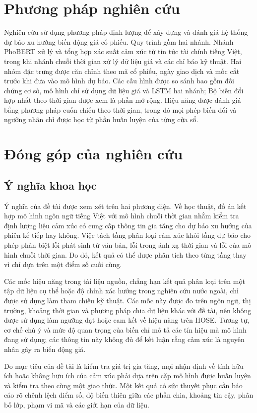 \documentclass[12pt, a4paper, oneside]{report}
\begin{document}
\section{Phương pháp nghiên cứu}

Nghiên cứu sử dụng phương pháp định lượng để xây dựng và đánh giá hệ thống dự báo
xu hướng biến động giá cổ phiếu. Quy trình gồm hai nhánh. Nhánh PhoBERT xử lý và tổng hợp
xác suất cảm xúc từ tin tức tài chính tiếng Việt, trong khi nhánh chuỗi thời gian xử lý dữ liệu
giá và các chỉ báo kỹ thuật. Hai nhóm đặc trưng được căn chỉnh theo mã cổ phiếu, ngày giao
dịch và mốc cắt trước khi đưa vào mô hình dự báo. Các cấu hình được so sánh bao gồm đối chứng cơ sở,
mô hình chỉ sử dụng dữ liệu giá và LSTM hai nhánh; Bộ biến đổi hợp nhất theo thời gian được xem là phần mở
rộng. Hiệu năng được đánh giá bằng phương pháp cuốn chiếu theo thời gian, trong đó mọi phép
biến đổi và ngưỡng nhãn chỉ được học từ phần huấn luyện của từng cửa sổ.
\section{Đóng góp của nghiên cứu}

\subsection{Ý nghĩa khoa học}

Ý nghĩa của đề tài được xem xét trên hai phương diện. Về học thuật, đồ án kết hợp mô hình
ngôn ngữ tiếng Việt với mô hình chuỗi thời gian nhằm kiểm tra định lượng liệu cảm xúc có
cung cấp thông tin gia tăng cho dự báo xu hướng của phiên kế tiếp hay không. Việc tách
tầng phân loại cảm xúc khỏi tầng dự báo cho phép phân biệt lỗi phát sinh từ văn bản, lỗi
trong ánh xạ thời gian và lỗi của mô hình chuỗi thời gian. Do đó, kết quả có thể được
phân tích theo từng tầng thay vì chỉ dựa trên một điểm số cuối cùng.

Các mốc hiệu năng trong tài liệu nguồn, chẳng hạn kết quả phân loại trên một tập dữ
liệu cụ thể hoặc độ chính xác hướng trong nghiên cứu nước ngoài, chỉ được sử dụng làm
tham chiếu kỹ thuật. Các mốc này được đo trên ngôn ngữ, thị trường, khoảng thời gian và
phương pháp chia dữ liệu khác với đề tài, nên không được sử dụng làm ngưỡng đạt hoặc
cam kết về hiệu năng trên HOSE. Tương tự, cơ chế chú ý và mức độ quan trọng của biến
chỉ mô tả các tín hiệu mà mô hình đang sử dụng; các thông tin này không đủ để kết luận
rằng cảm xúc là nguyên nhân gây ra biến động giá.

Do mục tiêu của đề tài là kiểm tra giá trị gia tăng, mọi nhận định về tính hữu ích hoặc
không hữu ích của cảm xúc phải dựa trên cặp mô hình được huấn luyện và kiểm tra theo
cùng một giao thức. Một kết quả có sức thuyết phục cần báo cáo rõ chênh lệch điểm số,
độ biến thiên giữa các phần chia, khoảng tin cậy, phân bố lớp, phạm vi mã và các giới
hạn của dữ liệu.
\end{document}
